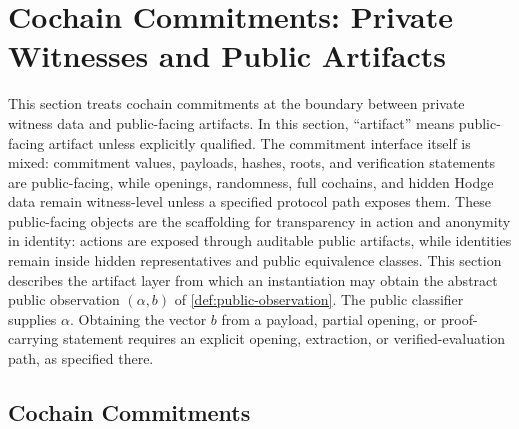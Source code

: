 \section{Cochain Commitments: Private Witnesses and Public Artifacts}\label{sec:public-artifacts-commitments}

This section treats cochain commitments at the boundary between private witness
data and public-facing artifacts. In this section, ``artifact'' means
public-facing artifact unless explicitly qualified. The commitment interface
itself is mixed: commitment values, payloads, hashes, roots, and verification
statements are public-facing, while openings, randomness, full cochains, and
hidden Hodge data remain witness-level unless a specified protocol path exposes
them.
These public-facing objects are the scaffolding for transparency in action and
anonymity in identity: actions are exposed through auditable public artifacts,
while identities remain inside hidden representatives and public equivalence
classes.
This section describes the artifact layer from which an instantiation may
obtain the abstract public observation \((\alpha,b)\) of
\cref{def:public-observation}. The public classifier supplies \(\alpha\).
Obtaining the vector \(b\) from a payload, partial opening, or proof-carrying
statement requires an explicit opening, extraction, or verified-evaluation
path, as specified there.

\subsection{Cochain Commitments}

